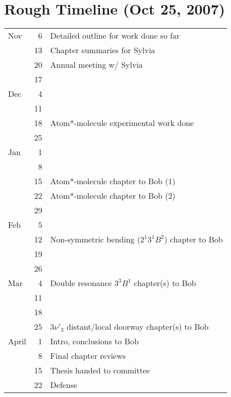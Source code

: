 \documentclass[12pt]{article}
\begin{document}
\section*{Rough Timeline (Oct 25, 2007)}

\begin{tabular}{l r l}
Nov & 6 & Detailed outline for work done so far \\
& 13 & Chapter summaries for Sylvia \\
& 20 & Annual meeting w/ Sylvia \\
& 17 & \\
Dec & 4 & \\
& 11 & \\
& 18 & Atom*-molecule experimental work done\\
& 25 & \\
Jan & 1 & \\
& 8 & \\
& 15 & Atom*-molecule chapter to Bob (1)\\
& 22 & Atom*-molecule chapter to Bob (2)\\
& 29 & \\
Feb & 5 & \\
& 12 & Non-symmetric bending ($2^1 3^1 B^2$) chapter to Bob \\
& 19 & \\
& 26 & \\
Mar & 4 & Double resonance $3^3 B^1$ chapter(s) to Bob \\
& 11 & \\
& 18 & \\
& 25 & $3 \nu'_3$ distant/local doorway chapter(s) to Bob\\
April & 1 & Intro, conclusions to Bob \\
& 8 & Final chapter reviews\\
& 15 & Thesis handed to committee \\
& 22 & Defense \\
\end{tabular}
\end{document}
